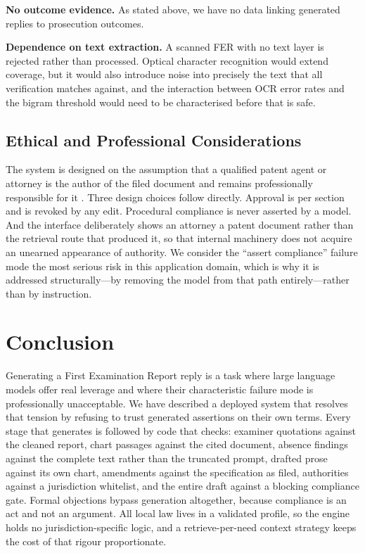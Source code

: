 \documentclass[conference]{IEEEtran}
\begin{document}
\textbf{No outcome evidence.} As stated above, we have no data linking generated replies to prosecution outcomes.

\textbf{Dependence on text extraction.} A scanned FER with no text layer is rejected rather than processed. Optical character recognition would extend coverage, but it would also introduce noise into precisely the text that all verification matches against, and the interaction between OCR error rates and the bigram threshold would need to be characterised before that is safe.

\subsection{Ethical and Professional Considerations}

The system is designed on the assumption that a qualified patent agent or attorney is the author of the filed document and remains professionally responsible for it \cite{mppp}. Three design choices follow directly. Approval is per section and is revoked by any edit. Procedural compliance is never asserted by a model. And the interface deliberately shows an attorney a patent document rather than the retrieval route that produced it, so that internal machinery does not acquire an unearned appearance of authority. We consider the ``assert compliance'' failure mode the most serious risk in this application domain, which is why it is addressed structurally---by removing the model from that path entirely---rather than by instruction.

\section{Conclusion}

Generating a First Examination Report reply is a task where large language models offer real leverage and where their characteristic failure mode is professionally unacceptable. We have described a deployed system that resolves that tension by refusing to trust generated assertions on their own terms. Every stage that generates is followed by code that checks: examiner quotations against the cleaned report, chart passages against the cited document, absence findings against the complete text rather than the truncated prompt, drafted prose against its own chart, amendments against the specification as filed, authorities against a jurisdiction whitelist, and the entire draft against a blocking compliance gate. Formal objections bypass generation altogether, because compliance is an act and not an argument. All local law lives in a validated profile, so the engine holds no jurisdiction-specific logic, and a retrieve-per-need context strategy keeps the cost of that rigour proportionate.
\end{document}

